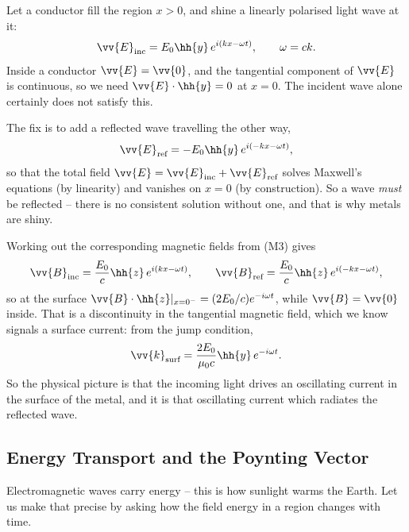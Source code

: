 \begin{example}
	Let a conductor fill the region $x>0$, and shine a linearly polarised light wave at it:
	$$
	\vv{E}_{\text{inc}} = E_0 \hh{y}\, e^{i(kx - \omega t)}, \qquad \omega = ck.
	$$
	Inside a conductor $\vv{E} = \vv{0}$, and the tangential component of $\vv{E}$ is continuous, so we need $\vv{E}\cdot\hh{y} = 0$ at $x = 0$. The incident wave alone certainly does not satisfy this.

	The fix is to add a reflected wave travelling the other way,
	$$
	\vv{E}_{\text{ref}} = -E_0\hh{y}\, e^{i(-kx-\omega t)},
	$$
	so that the total field $\vv{E} = \vv{E}_{\text{inc}} + \vv{E}_{\text{ref}}$ solves Maxwell's equations (by linearity) and vanishes on $x = 0$ (by construction). So a wave \emph{must} be reflected -- there is no consistent solution without one, and that is why metals are shiny.

	Working out the corresponding magnetic fields from (M3) gives
	$$
	\vv{B}_{\text{inc}} = \frac{E_0}{c}\hh{z}\,e^{i(kx-\omega t)}, \qquad \vv{B}_{\text{ref}} = \frac{E_0}{c}\hh{z}\,e^{i(-kx-\omega t)},
	$$
	so at the surface $\vv{B}\cdot\hh{z}|_{x = 0^-} = (2E_0/c)e^{-i\omega t}$, while $\vv{B} = \vv{0}$ inside. That is a discontinuity in the tangential magnetic field, which we know signals a surface current: from the jump condition,
	$$
	\vv{k}_{\text{surf}} = \frac{2E_0}{\mu_0 c}\hh{y}\, e^{-i\omega t}.
	$$
	So the physical picture is that the incoming light drives an oscillating current in the surface of the metal, and it is that oscillating current which radiates the reflected wave.
\end{example}

\subsection{Energy Transport and the Poynting Vector}

Electromagnetic waves carry energy -- this is how sunlight warms the Earth. Let us make that precise by asking how the field energy in a region changes with time.

